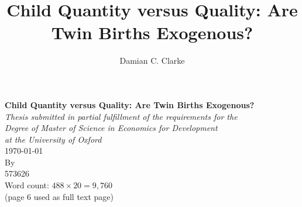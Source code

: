 \documentclass{article}[11pt,subeqn]
\title{Child Quantity versus Quality: Are Twin Births Exogenous?}
\author{Damian C. Clarke}
\begin{document}
\begin{spacing}{1.25}


\renewcommand{\thefootnote}{\fnsymbol{footnote}}
\begin{titlepage}
\begin{center} 
\textbf{\Large Child Quantity versus Quality: Are Twin Births Exogenous?}\\
\vspace{3cm}
\emph{Thesis submitted in partial fulfillment of the requirements for the\\
Degree of Master of Science in Economics for Development\\ at the University
of Oxford}\\
\vspace{0.2cm}
\today\\
\vspace{3.5cm}
By\\
\vspace{2.5cm}
573626\\
\vfill
Word count: $488\times20=9,760$ \\(page 6 used as full text page)
\end{center}
\end{titlepage}



\end{spacing}
\end{document}
